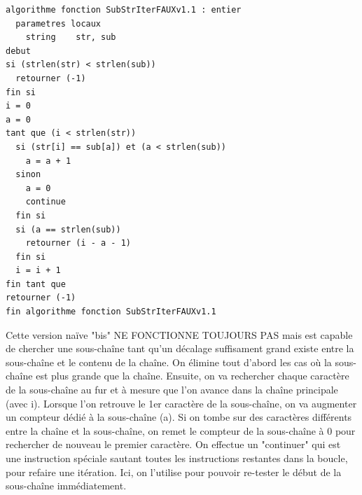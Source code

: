 \documentclass[11pt,a4paper]{article}
\begin{document}
\begin{table}[ht!]
  \centering
\begin{lstlisting}[style=algorithmique]
algorithme fonction SubStrIterFAUXv1.1 : entier
  parametres locaux
    string    str, sub
debut
si (strlen(str) < strlen(sub))
  retourner (-1)
fin si
i = 0
a = 0
tant que (i < strlen(str))
  si (str[i] == sub[a]) et (a < strlen(sub))
    a = a + 1
  sinon
    a = 0
    continue
  fin si
  si (a == strlen(sub))
    retourner (i - a - 1)
  fin si
  i = i + 1
fin tant que
retourner (-1)
fin algorithme fonction SubStrIterFAUXv1.1 \end{lstlisting}
  \caption{Cette version naïve "bis" NE FONCTIONNE TOUJOURS PAS mais est capable de chercher une sous-chaîne tant qu'un décalage suffisament grand existe entre la sous-chaîne et le contenu de la chaîne. On élimine tout d'abord les cas où la sous-chaîne est plus grande que la chaîne. Ensuite, on va rechercher chaque caractère de la sous-chaîne au fur et à mesure que l'on avance dans la chaîne principale (avec i). Lorsque l'on retrouve le 1er caractère de la sous-chaîne, on va augmenter un compteur dédié à la sous-chaîne (a). Si on tombe sur des caractères différents entre la chaîne et la sous-chaîne, on remet le compteur de la sous-chaîne à 0 pour rechercher de nouveau le premier caractère. On effectue un "continuer" qui est une instruction spéciale sautant toutes les instructions restantes dans la boucle, pour refaire une itération. Ici, on l'utilise pour pouvoir re-tester le début de la sous-chaîne immédiatement.}
\end{table}


\vfillLast

\clearpage

\vfillFirst
\end{document}
